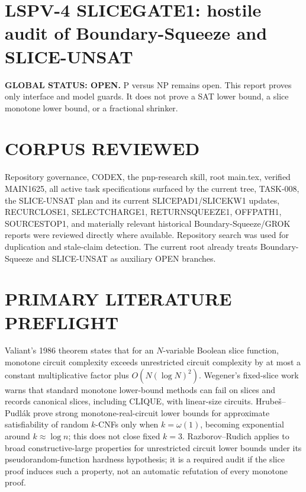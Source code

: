 \documentclass[11pt]{article}
\begin{document}
\section*{LSPV-4 SLICEGATE1: hostile audit of Boundary-Squeeze and SLICE-UNSAT}
\textbf{GLOBAL STATUS: OPEN.} P versus NP remains open. This report proves only interface and model guards. It does not prove a SAT lower bound, a slice monotone lower bound, or a fractional shrinker.

\section*{CORPUS REVIEWED}
Repository governance, CODEX, the pnp-research skill, root main.tex, verified MAIN1625, all active task specifications surfaced by the current tree, TASK-008, the SLICE-UNSAT plan and its current SLICEPAD1/SLICEKW1 updates, RECURCLOSE1, SELECTCHARGE1, RETURNSQUEEZE1, OFFPATH1, SOURCESTOP1, and materially relevant historical Boundary-Squeeze/GROK reports were reviewed directly where available. Repository search was used for duplication and stale-claim detection. The current root already treats Boundary-Squeeze and SLICE-UNSAT as auxiliary OPEN branches.

\section*{PRIMARY LITERATURE PREFLIGHT}
Valiant's 1986 theorem states that for an $N$-variable Boolean slice function, monotone circuit complexity exceeds unrestricted circuit complexity by at most a constant multiplicative factor plus $O(N(\log N)^2)$. Wegener's fixed-slice work warns that standard monotone lower-bound methods can fail on slices and records canonical slices, including CLIQUE, with linear-size circuits. Hrube\v{s}--Pudl\'ak prove strong monotone-real-circuit lower bounds for approximate satisfiability of random $k$-CNFs only when $k=\omega(1)$, becoming exponential around $k\approx\log n$; this does not close fixed $k=3$. Razborov--Rudich applies to broad constructive-large properties for unrestricted circuit lower bounds under its pseudorandom-function hardness hypothesis; it is a required audit if the slice proof induces such a property, not an automatic refutation of every monotone proof.
\end{document}
